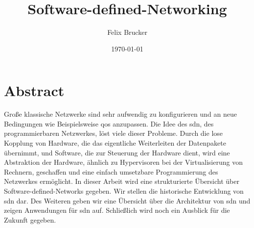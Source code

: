 \documentclass[twoside,12pt]{scrartcl}
\title{Software-defined-Networking}
\author{Felix Brucker}
\date{\today}
\begin{document}
	
	
	
	\pagestyle{scrheadings}
	\clearscrheadfoot
	\ohead{\leftmark}
	\ifoot{\pagemark} 
	\setheadsepline{1pt} 
	\setfootsepline{1pt}
	
	
	\maketitle
	
	\tableofcontents
	
	\newpage
	
	\printglossary[type=\acronymtype,style=longwithindent]
	\newpage
	
	\section{Abstract}
	
	\onehalfspacing
	
	Große klassische Netzwerke sind sehr aufwendig zu konfigurieren und an neue Bedingungen wie Beispielsweise \gls{qos} anzupassen. Die Idee des \gls{sdn}, des programmierbaren Netzwerkes, löst viele dieser Probleme. Durch die lose Kopplung von Hardware, die das eigentliche Weiterleiten der Datenpakete übernimmt, und Software, die zur Steuerung der Hardware dient, wird eine Abstraktion der Hardware, ähnlich zu Hypervisoren bei der Virtualisierung von Rechnern, geschaffen und eine einfach umsetzbare Programmierung des Netzwerkes ermöglicht. In dieser Arbeit wird eine strukturierte Übersicht über Software-defined-Networks gegeben. Wir stellen die historische Entwicklung von \gls{sdn} dar. Des Weiteren geben wir eine Übersicht über die Architektur von \gls{sdn} und zeigen Anwendungen für \gls{sdn} auf. Schließlich wird noch ein Ausblick für die Zukunft gegeben.
	
\end{document}
